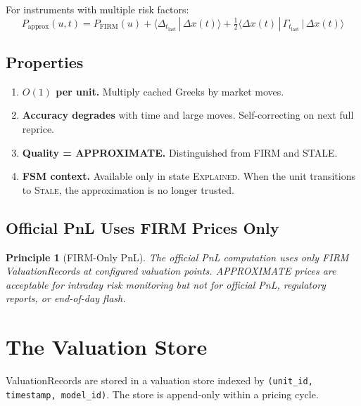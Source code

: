\documentclass[11pt,a4paper]{article}
\newtheorem{principle}[definition]{Principle}
\begin{document}
For instruments with multiple risk factors:
\begin{equation}
P_{\mathrm{approx}}(u, t) = P_{\mathrm{FIRM}}(u) + \langle \Delta_{t_{\mathrm{last}}} \,|\, \Delta x(t) \rangle + \tfrac{1}{2}\langle \Delta x(t) \,|\, \Gamma_{t_{\mathrm{last}}} \,|\, \Delta x(t) \rangle
\end{equation}

\subsection{Properties}

\begin{enumerate}
\item \textbf{$O(1)$ per unit.}  Multiply cached Greeks by market moves.
\item \textbf{Accuracy degrades} with time and large moves.  Self-correcting on next full reprice.
\item \textbf{Quality = APPROXIMATE.}  Distinguished from FIRM and STALE.
\item \textbf{FSM context.}  Available only in state \textsc{Explained}.  When the unit transitions to \textsc{Stale}, the approximation is no longer trusted.
\end{enumerate}

\subsection{Official PnL Uses FIRM Prices Only}

\begin{principle}[FIRM-Only PnL]
\label{princ:firm-pnl}
The official PnL computation uses only FIRM ValuationRecords at configured valuation points.  APPROXIMATE prices are acceptable for intraday risk monitoring but not for official PnL, regulatory reports, or end-of-day flash.
\end{principle}

\clearpage
\section{The Valuation Store}
\label{sec:valuation-store}

ValuationRecords are stored in a valuation store indexed by \texttt{(unit\_id, timestamp, model\_id)}.  The store is append-only within a pricing cycle.
\end{document}
